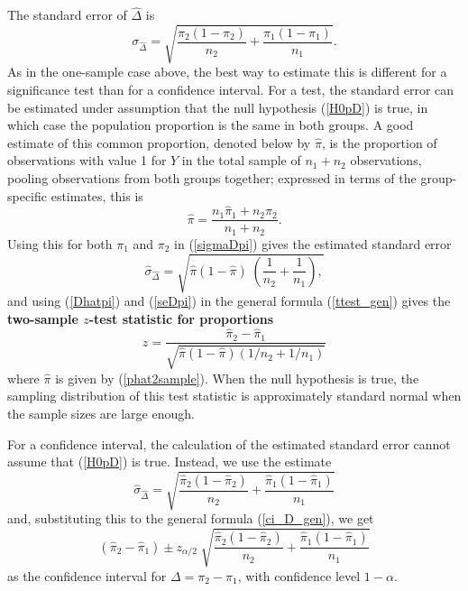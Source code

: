 The standard error of $\hat{\Delta}$ is
\begin{equation}
\sigma_{\hat{\Delta}} =
\sqrt{
\frac{\pi_{2}(1-\pi_{2})}{n_{2}}
+\frac{\pi_{1}(1-\pi_{1})}{n_{1}}
}.
\label{sigmaDpi}
\end{equation}
As in the one-sample case above, the best way to estimate this
is different for a significance test than for a confidence interval.
For a test, the standard error can be estimated under assumption that
the null
hypothesis (\ref{H0pD}) is true,
in which case the population proportion is the
same in both groups. A good estimate of this common proportion, denoted
below by $\hat{\pi}$,
is the proportion of observations
with value 1 for $Y$ in the total sample of $n_{1}+n_{2}$ observations,
pooling observations from both groups together; expressed in terms of the
group-specific estimates, this is
\begin{equation}
\hat{\pi} = \frac{n_{1}\hat{\pi}_{1}+n_{2}\hat{\pi}_{2}}{n_{1}+n_{2}}.
\label{phat2sample}
\end{equation}
Using this for both
$\pi_{1}$ and $\pi_{2}$ in (\ref{sigmaDpi}) gives the
estimated standard error
\begin{equation}
\hat{\sigma}_{\hat{\Delta}}=
\sqrt{
\hat{\pi}(1-\hat{\pi}) \; \left(
\frac{1}{n_{2}}+
\frac{1}{n_{1}}
\right),
}
\label{seDpi}
\end{equation}
and using (\ref{Dhatpi}) and (\ref{seDpi}) in the general formula
(\ref{ttest_gen}) gives the \textbf{two-sample $z$-test statistic for
proportions}
\begin{equation}
z=
\frac{\hat{\pi}_{2}-\hat{\pi}_{1}}
{\sqrt{\hat{\pi}(1-\hat{\pi})(1/n_{2}+1/n_{1})}}
\label{ztestDpi}
\end{equation}
where $\hat{\pi}$ is given by (\ref{phat2sample}). When the null
hypothesis is true, the sampling distribution of this test statistic is
approximately standard normal when the sample sizes are large enough.

For a confidence interval, the calculation of the estimated standard error cannot
assume that (\ref{H0pD}) is true. Instead, we use
the estimate
\begin{equation}
\hat{\sigma}_{\hat{\Delta}} =
\sqrt{
\frac{\hat{\pi}_{2}(1-\hat{\pi}_{2})}{n_{2}} +
\frac{\hat{\pi}_{1}(1-\hat{\pi}_{1})}{n_{1}}
}
\label{seDpi2}
\end{equation}
and, substituting this to the general formula (\ref{ci_D_gen}), we get
\begin{equation}
(\hat{\pi}_{2}-\hat{\pi}_{1}) \pm z_{\alpha/2} \;
\sqrt{
\frac{\hat{\pi}_{2}(1-\hat{\pi}_{2})}{n_{2}} +
\frac{\hat{\pi}_{1}(1-\hat{\pi}_{1})}{n_{1}}
}
\label{ciDpi}
\end{equation}
as the
confidence interval
for $\Delta=\pi_{2}-\pi_{1}$, with confidence level $1-\alpha$.

